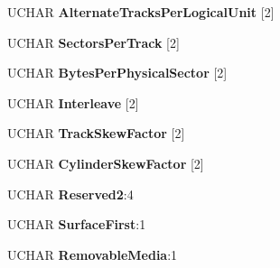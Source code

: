 \begin{DoxyCompactItemize}
\item 
\mbox{\label{struct___m_o_d_e___f_o_r_m_a_t___p_a_g_e_acd54c9a9b5efc0e92f38e8e1356d7f61}} 
U\+C\+H\+AR {\bfseries Alternate\+Tracks\+Per\+Logical\+Unit} \mbox{[}2\mbox{]}
\item 
\mbox{\label{struct___m_o_d_e___f_o_r_m_a_t___p_a_g_e_aad815604ba01d76062284cc146292474}} 
U\+C\+H\+AR {\bfseries Sectors\+Per\+Track} \mbox{[}2\mbox{]}
\item 
\mbox{\label{struct___m_o_d_e___f_o_r_m_a_t___p_a_g_e_a6868b3a539f209f2c850565a3eeb950f}} 
U\+C\+H\+AR {\bfseries Bytes\+Per\+Physical\+Sector} \mbox{[}2\mbox{]}
\item 
\mbox{\label{struct___m_o_d_e___f_o_r_m_a_t___p_a_g_e_a27d0d1ee230c6e90243ab8d9b7181f15}} 
U\+C\+H\+AR {\bfseries Interleave} \mbox{[}2\mbox{]}
\item 
\mbox{\label{struct___m_o_d_e___f_o_r_m_a_t___p_a_g_e_a3483e7cfd019229a9e7d65529dff413d}} 
U\+C\+H\+AR {\bfseries Track\+Skew\+Factor} \mbox{[}2\mbox{]}
\item 
\mbox{\label{struct___m_o_d_e___f_o_r_m_a_t___p_a_g_e_a797a96c3471bd462bc468fb441291c8b}} 
U\+C\+H\+AR {\bfseries Cylinder\+Skew\+Factor} \mbox{[}2\mbox{]}
\item 
\mbox{\label{struct___m_o_d_e___f_o_r_m_a_t___p_a_g_e_a1dd85cddda35e13454525c242cd2de0c}} 
U\+C\+H\+AR {\bfseries Reserved2}\+:4
\item 
\mbox{\label{struct___m_o_d_e___f_o_r_m_a_t___p_a_g_e_a03cae825b155d25e8535311e4a4e0e29}} 
U\+C\+H\+AR {\bfseries Surface\+First}\+:1
\item 
\mbox{\label{struct___m_o_d_e___f_o_r_m_a_t___p_a_g_e_a9431da904f34b5d56c949050082e2146}} 
U\+C\+H\+AR {\bfseries Removable\+Media}\+:1
\item 

\end{DoxyCompactItemize}
